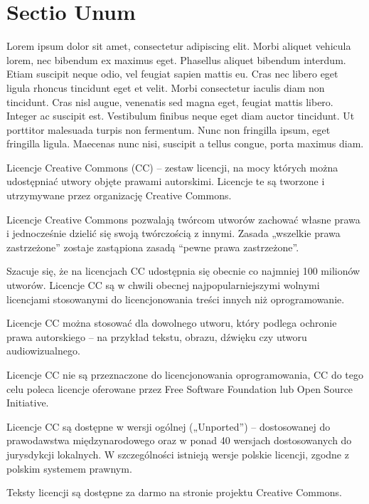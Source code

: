 \section{Sectio Unum}
Lorem ipsum dolor sit amet, consectetur adipiscing elit. Morbi aliquet vehicula lorem, nec bibendum ex maximus eget. Phasellus aliquet bibendum interdum. Etiam suscipit neque odio, vel feugiat sapien mattis eu. Cras nec libero eget ligula rhoncus tincidunt eget et velit. Morbi consectetur iaculis diam non tincidunt. Cras nisl augue, venenatis sed magna eget, feugiat mattis libero. Integer ac suscipit est. Vestibulum finibus neque eget diam auctor tincidunt. Ut porttitor malesuada turpis non fermentum. Nunc non fringilla ipsum, eget fringilla ligula. Maecenas nunc nisi, suscipit a tellus congue, porta maximus diam.

Licencje Creative Commons (CC) – zestaw licencji, na mocy których można udostępniać utwory objęte prawami autorskimi. Licencje te są tworzone i utrzymywane przez organizację Creative Commons.

Licencje Creative Commons pozwalają twórcom utworów zachować własne prawa i jednocześnie dzielić się swoją twórczością z innymi. Zasada „wszelkie prawa zastrzeżone” zostaje zastąpiona zasadą “pewne prawa zastrzeżone”.

Szacuje się, że na licencjach CC udostępnia się obecnie co najmniej 100 milionów utworów. Licencje CC są w chwili obecnej najpopularniejszymi wolnymi licencjami stosowanymi do licencjonowania treści innych niż oprogramowanie.

Licencje CC można stosować dla dowolnego utworu, który podlega ochronie prawa autorskiego – na przykład tekstu, obrazu, dźwięku czy utworu audiowizualnego.

Licencje CC nie są przeznaczone do licencjonowania oprogramowania, CC do tego celu poleca licencje oferowane przez Free Software Foundation lub Open Source Initiative.

Licencje CC są dostępne w wersji ogólnej („Unported”) – dostosowanej do prawodawstwa międzynarodowego oraz w ponad 40 wersjach dostosowanych do jurysdykcji lokalnych. W szczególności istnieją wersje polskie licencji, zgodne z polskim systemem prawnym.

Teksty licencji są dostępne za darmo na stronie projektu Creative Commons.

